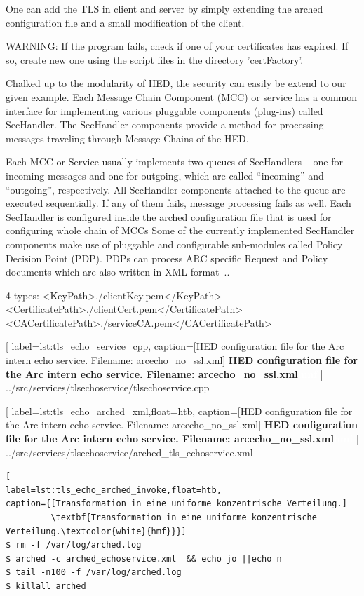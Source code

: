 One can add the TLS in client and server by simply extending the arched configuration file and a small modification of the client.

WARNING: If the program fails, check if one of your certificates has expired.
If so, create new one using the script files in the directory 'certFactory'.

Chalked up to the modularity of HED, the security can easily be extend to our given example.
Each Message Chain Component (MCC) or service has a common interface for implementing various pluggable components (plug-ins) called SecHandler.
The SecHandler components provide a method for processing messages traveling through Message Chains of the HED. 

Each MCC or Service usually implements two queues of SecHandlers – one for incoming messages and one for outgoing, which are called “incoming” and “outgoing”, respectively.
All SecHandler components attached to the queue are executed sequentially. 
If any of them fails, message processing fails as well. 
Each SecHandler is configured inside the arched configuration file that is used for configuring whole chain of MCCs 
Some of the currently implemented SecHandler components make use of pluggable and configurable sub-modules called Policy Decision Point (PDP).
PDPs can process ARC specific Request and Policy documents which are also written in XML format~\cite{QIANG_2008}..


4 types:
                <KeyPath>./clientKey.pem</KeyPath>
                <CertificatePath>./clientCert.pem</CertificatePath>
                <CACertificatePath>./serviceCA.pem</CACertificatePath>


	[
	label=lst:tls_echo_service_cpp,
	caption={[HED configuration file for the Arc intern echo service. Filename: arcecho\_no\_ssl.xml]
	\textbf{HED configuration file for the Arc intern echo service. Filename: arcecho\_no\_ssl.xml\textcolor{white}{hmf}}}
	]
{../src/services/tlsechoservice/tlsechoservice.cpp}





	[
	label=lst:tls_echo_arched_xml,float=htb,
	caption={[HED configuration file for the Arc intern echo service. Filename: arcecho\_no\_ssl.xml]
	\textbf{HED configuration file for the Arc intern echo service. Filename: arcecho\_no\_ssl.xml\textcolor{white}{hmf}}}
	]
{../src/services/tlsechoservice/arched_tls_echoservice.xml}


\begin{lstlisting}[
label=lst:tls_echo_arched_invoke,float=htb,
caption={[Transformation in eine uniforme konzentrische Verteilung.]
         \textbf{Transformation in eine uniforme konzentrische Verteilung.\textcolor{white}{hmf}}}]
$ rm -f /var/log/arched.log
$ arched -c arched_echoservice.xml  && echo jo ||echo n
$ tail -n100 -f /var/log/arched.log
$ killall arched
\end{lstlisting}




